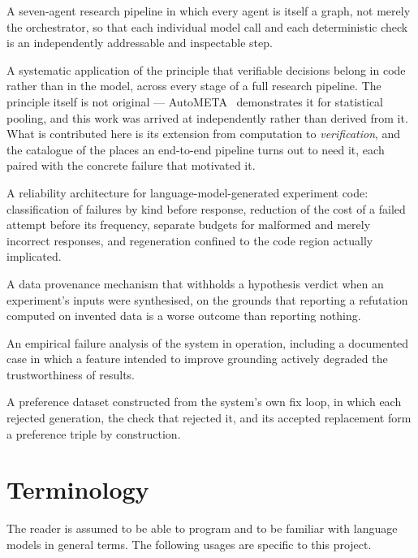 \begin{description}[style=unboxed,leftmargin=0pt,itemsep=0.25em,font=\normalfont\bfseries]
  \item[C1] A seven-agent research pipeline in which every agent is itself a graph, not merely
    the orchestrator, so that each individual model call and each deterministic check is an
    independently addressable and inspectable step.
  \item[C2] A systematic application of the principle that verifiable decisions belong in code
    rather than in the model, across every stage of a full research pipeline. The principle
    itself is not original --- AutoMETA~\cite{lee2026autometa} demonstrates it for statistical
    pooling, and this work was arrived at independently rather than derived from it. What is
    contributed here is its extension from computation to \emph{verification}, and the
    catalogue of the places an end-to-end pipeline turns out to need it, each paired with the
    concrete failure that motivated it.
  \item[C3] A reliability architecture for language-model-generated experiment code:
    classification of failures by kind before response, reduction of the cost of a failed
    attempt before its frequency, separate budgets for malformed and merely incorrect
    responses, and regeneration confined to the code region actually implicated.
  \item[C4] A data provenance mechanism that withholds a hypothesis verdict when an
    experiment's inputs were synthesised, on the grounds that reporting a refutation computed
    on invented data is a worse outcome than reporting nothing.
  \item[C5] An empirical failure analysis of the system in operation, including a documented
    case in which a feature intended to improve grounding actively degraded the trustworthiness
    of results.
  \item[C6] A preference dataset constructed from the system's own fix loop, in which each
    rejected generation, the check that rejected it, and its accepted replacement form a
    preference triple by construction.
\end{description}

\section{Terminology}
\label{sec:terminology}

The reader is assumed to be able to program and to be familiar with language models in
general terms. The following usages are specific to this project.

